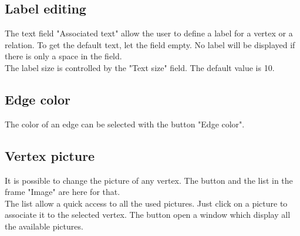 \subsection{Label editing}
The text field "Associated text" allow the user to define a label for a vertex or a relation. To get the default text, let the field empty. No label will be displayed if there is only a space in the field.\\

The label size is controlled by the "Text size" field. The default value is 10.\\

\subsection{Edge color}
The color of an edge can be selected with the button "Edge color".\\

\subsection{Vertex picture}

It is possible to change the picture of any vertex. The button and the list in the frame "Image" are here for that.\\


The list allow a quick access to all the used pictures. Just click on a picture to associate it to the selected vertex. The button open a window which display all the available pictures.\\ 

